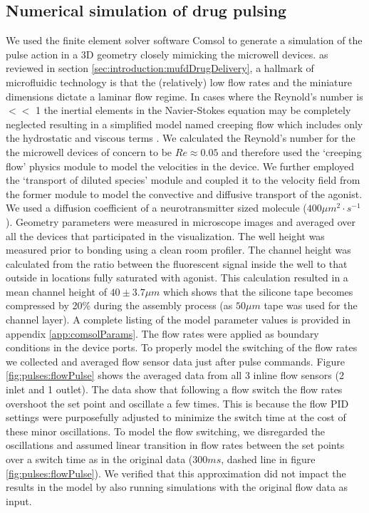 \subsection{Numerical simulation of drug pulsing}
\label{sec:pulses:comsol}
We used the finite element solver software Comsol to generate a simulation of the pulse action in a 3D geometry closely mimicking the microwell devices. as reviewed in section \ref{sec:introduction:mufdDrugDelivery}, a hallmark of microfluidic technology is that the (relatively) low flow rates and the miniature dimensions dictate a laminar flow regime. In cases where the Reynold's number is \(<<\) 1 the inertial elements in the Navier-Stokes equation may be completely neglected resulting in a simplified model named creeping flow which includes only the hydrostatic and viscous terms \cite{fluidBook}. We calculated the Reynold's number for the the microwell devices of concern to be \(Re\approx 0.05\) and therefore used the `creeping flow' physics module to model the velocities in the device. We further employed the `transport of diluted species' module and coupled it to the velocity field from the former module to model the convective and diffusive transport of the agonist. We used a diffusion coefficient of a neurotransmitter sized molecule (\(400 \mu m^2\cdot s^{-1}\)). Geometry parameters were measured in microscope images and averaged over all the devices that participated in the visualization. The well height was measured prior to bonding using a clean room profiler. The channel height was calculated from the ratio between the fluorescent signal inside the well to that outside in locations fully saturated with agonist. This calculation resulted in a mean channel height of \(40\pm 3.7 \mu m\) which shows that the silicone tape becomes compressed by 20\% during the assembly process (as \(50 \mu m\) tape was used for the channel layer). A complete listing of the model parameter values is provided in appendix \ref{app:comsolParams}. The flow rates were applied as boundary conditions in the device ports. To properly model the switching of the flow rates we collected and averaged flow sensor data just after pulse commands. Figure \ref{fig:pulses:flowPulse} shows the averaged data from all 3 inline flow sensors (2 inlet and 1 outlet). The data show that following a flow switch the flow rates overshoot the set point and oscillate a few times. This is because the flow PID settings were purposefully adjusted to minimize the switch time at the cost of these minor oscillations. To model the flow switching, we disregarded the oscillations and assumed linear transition in flow rates between the set points over a switch time as in the original data (\(300 ms\), dashed line in figure \ref{fig:pulses:flowPulse}). We verified that this approximation did not impact the results in the model by also running simulations with the original flow data as input.

